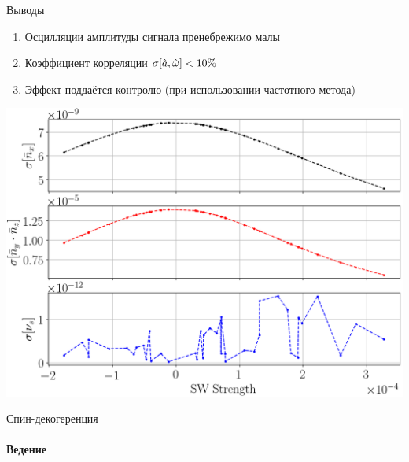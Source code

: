 \documentclass[14pt]{beamer}
\begin{document}
\begin{frame}{Выводы}
	\begin{enumerate}
		\item Осцилляции амплитуды сигнала пренебрежимо малы
		\item Коэффициент корреляции $\sigma[\hat a, \hat{\omega}] < 10\%$
		\item Эффект поддаётся контролю (при использовании частотного метода)
	\end{enumerate}
\end{frame}

\begin{frame}\centering
	\includegraphics[width=.8\linewidth]{smp_sim/NBAR_variation_sd_vs_SW}
\end{frame}

\begin{frame}{Спин-декогеренция}
	\framesubtitle{Ведение}
	\centering
\end{frame}
\end{document}
